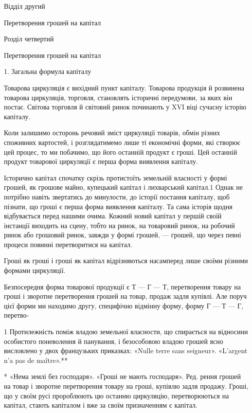 Відділ другий

Перетворення грошей на капітал

Розділ четвертий

Перетворення грошей на капітал

1. Загальна формула капіталу

Товарова циркуляція є вихідний пункт капіталу. Товарова
продукція й розвинена товарова циркуляція, торговля, становлять
історичні передумови, за яких він постає. Світова торговля
й світовий ринок починають у XVI віці сучасну історію
капіталу.

Коли залишимо осторонь речовий зміст циркуляції товарів,
обмін різних споживних вартостей, і розглядатимемо лише ті
економічні форми, які створює цей процес, то ми побачимо,
що його останній продукт є гроші. Цей останній продукт товарової
циркуляції є перша форма виявлення капіталу.

Історично капітал спочатку скрізь протистоїть земельній
власності у формі грошей, як грошове майно, купецький капітал
і лихварський капітал.1 Однак не потрібно навіть звертатись до
минулости, до історії постання капіталу, щоб пізнати, що гроші
є перша форма виявлення капіталу. Та сама історія щодня відбувається
перед нашими очима. Кожний новий капітал у першій
своїй інстанції виходить на сцену, тобто на ринок, на товаровий
ринок, на робочий ринок або грошовий ринок, завжди у формі
грошей, — грошей, що через певні процеси повинні перетворитися
на капітал.

Гроші як гроші і гроші як капітал відрізняються насамперед
лише своїми різними формами циркуляції.

Безпосередня форма товарової продукції є Т — Г — Т, перетворення
товару на гроші і зворотне перетворення грошей на
товар, продаж задля купівлі. Але поруч цієї форми ми находимо
другу, специфічно відмінну форму, форму Г — Т — Г, перетво-

1    Протилежність поміж владою земельної власности, що спирається
на відносини особистого поневолення й панування, і безособовою владою
грошей ясно висловлено у двох французьких приказках: «Nulle terre
sans seigneur». «L’argent n’a pas de maître».**

* «Нема землі без господаря». «Гроші не мають господаря». Ред.
рення грошей на товар і зворотне перетворення товару на гроші,
купівлю задля продажу. Гроші, що у своїм русі пророблюють
цю останню циркуляцію, перетворюються на капітал, стають
капіталом і вже за своїм призначенням є капітал.

